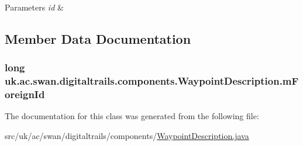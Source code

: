 \begin{DoxyParams}{Parameters}
{\em id} & \\
\hline
\end{DoxyParams}


\subsection{Member Data Documentation}
\hypertarget{classuk_1_1ac_1_1swan_1_1digitaltrails_1_1components_1_1_waypoint_description_a1df2c3231c28135521513cb4495af840}{
\subsubsection[{m\+Foreign\+Id}]{\setlength{\rightskip}{0pt plus 5cm}long uk.\+ac.\+swan.\+digitaltrails.\+components.\+Waypoint\+Description.\+m\+Foreign\+Id\hspace{0.3cm}{\ttfamily [protected]}}}\label{classuk_1_1ac_1_1swan_1_1digitaltrails_1_1components_1_1_waypoint_description_a1df2c3231c28135521513cb4495af840}


The documentation for this class was generated from the following file\+:\begin{DoxyCompactItemize}
\item 
src/uk/ac/swan/digitaltrails/components/\hyperlink{_waypoint_description_8java}{Waypoint\+Description.\+java}\end{DoxyCompactItemize}
